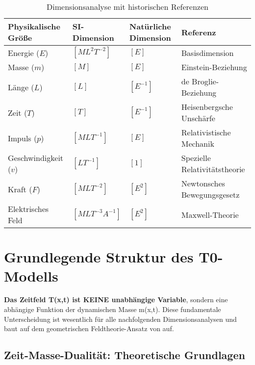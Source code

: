 \documentclass[12pt,a4paper]{article}
\begin{document}
	\begin{table}[htbp]
		\footnotesize
		\centering
		\begin{tabular}{p{3cm}p{2.5cm}p{2cm}p{6cm}}
			\toprule
			\textbf{Physikalische Größe} & \textbf{SI-Dimension} & \textbf{Natürliche Dimension} & \textbf{Referenz} \\
			\midrule
			Energie ($E$) & $[ML^2T^{-2}]$ & $[E]$ & Basisdimension \citep{weinberg1995} \\
			Masse ($m$) & $[M]$ & $[E]$ & Einstein-Beziehung \citep{einstein1905} \\
			Länge ($L$) & $[L]$ & $[E^{-1}]$ & de Broglie-Beziehung \citep{debroglie1924} \\
			Zeit ($T$) & $[T]$ & $[E^{-1}]$ & Heisenbergsche Unschärfe \citep{heisenberg1927} \\
			Impuls ($p$) & $[MLT^{-1}]$ & $[E]$ & Relativistische Mechanik \citep{weinberg1995} \\
			Geschwindigkeit ($v$) & $[LT^{-1}]$ & $[1]$ & Spezielle Relativitätstheorie \citep{einstein1905} \\
			Kraft ($F$) & $[MLT^{-2}]$ & $[E^2]$ & Newtonsches Bewegungsgesetz \\
			Elektrisches Feld & $[MLT^{-3}A^{-1}]$ & $[E^2]$ & Maxwell-Theorie \citep{jackson1998} \\
			\bottomrule
		\end{tabular}
		\caption{Dimensionsanalyse mit historischen Referenzen}
		\label{tab:dimensions_with_refs}
	\end{table}
	
	\section{Grundlegende Struktur des T0-Modells}
	\label{sec:fundamental_structure}
	
	\begin{tcolorbox}[colback=red!5!white,colframe=red!75!black,title=Kritische Anmerkung zur mathematischen Struktur]
		\textbf{Das Zeitfeld T(x,t) ist KEINE unabhängige Variable}, sondern eine abhängige Funktion der dynamischen Masse m(x,t). Diese fundamentale Unterscheidung ist wesentlich für alle nachfolgenden Dimensionsanalysen und baut auf dem geometrischen Feldtheorie-Ansatz von \citet{misner1973} auf.
	\end{tcolorbox}
	
	\subsection{Zeit-Masse-Dualität: Theoretische Grundlagen}
	\label{subsec:time_mass_duality}
	
\end{document}
